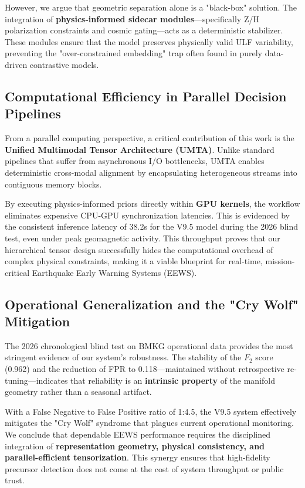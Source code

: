 \documentclass[a4paper,fleqn]{cas-sc}
\begin{document}
However, we argue that geometric separation alone is a "black-box" solution. The integration of \textbf{physics-informed sidecar modules}—specifically Z/H polarization constraints and cosmic gating—acts as a deterministic stabilizer. These modules ensure that the model preserves physically valid ULF variability, preventing the "over-constrained embedding" trap often found in purely data-driven contrastive models.

\subsection{Computational Efficiency in Parallel Decision Pipelines}
From a parallel computing perspective, a critical contribution of this work is the \textbf{Unified Multimodal Tensor Architecture (UMTA)}. Unlike standard pipelines that suffer from asynchronous I/O bottlenecks, UMTA enables deterministic cross-modal alignment by encapsulating heterogeneous streams into contiguous memory blocks. 

By executing physics-informed priors directly within \textbf{GPU kernels}, the workflow eliminates expensive CPU-GPU synchronization latencies. This is evidenced by the consistent inference latency of 38.2s for the V9.5 model during the 2026 blind test, even under peak geomagnetic activity. This throughput proves that our hierarchical tensor design successfully hides the computational overhead of complex physical constraints, making it a viable blueprint for real-time, mission-critical Earthquake Early Warning Systems (EEWS).

\subsection{Operational Generalization and the "Cry Wolf" Mitigation}
The 2026 chronological blind test on BMKG operational data provides the most stringent evidence of our system's robustness. The stability of the $F_2$ score (0.962) and the reduction of FPR to 0.118—maintained without retrospective re-tuning—indicates that reliability is an \textbf{intrinsic property} of the manifold geometry rather than a seasonal artifact. 

With a False Negative to False Positive ratio of 1:4.5, the V9.5 system effectively mitigates the "Cry Wolf" syndrome that plagues current operational monitoring. We conclude that dependable EEWS performance requires the disciplined integration of \textbf{representation geometry, physical consistency, and parallel-efficient tensorization}. This synergy ensures that high-fidelity precursor detection does not come at the cost of system throughput or public trust.
\end{document}
